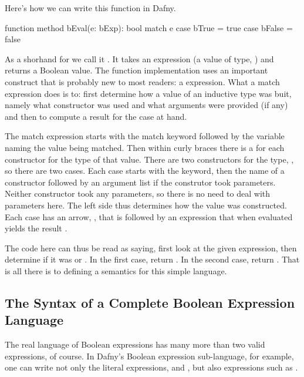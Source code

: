 \documentclass[letterpaper,10pt,english]{sphinxmanual}
\begin{document}
Here’s how we can write this function in Dafny.

\begin{sphinxVerbatim}[commandchars=\\\{\}]
function method bEval(e: bExp): bool
\PYGZob{}
  match e
  \PYGZob{}
      case bTrue =\PYGZgt{} true
      case bFalse =\PYGZgt{} false
  \PYGZcb{}
\PYGZcb{}
\end{sphinxVerbatim}

As a shorhand for  we call it . It
takes an expression (a value of type, ) and returns a Boolean
value.  The function implementation uses an important construct that
is probably new to most readers: a  expression. What a match
expression does is to: first determine how a value of an inductive
type was buit, namely what constructor was used and what arguments
were provided (if any) and then to compute a result for the case at
hand.

The match expression starts with the match keyword followed by the
variable naming the value being matched. Then within curly braces
there is a  for each constructor for the type of that value.
There are two constructors for the type, , so there are two
cases. Each case starts with the  keyword, then the name of a
constructor followed by an argument list if the construtor took
parameters. Neither constructor took any parameters, so there is no
need to deal with parameters here. The left side thus determines how
the value was constructed. Each case has an arrow, \sphinxstyleemphasis{=\textgreater{}}, that is
followed by an expression that when evaluated yields the result .

The code here can thus be read as saying, first look at the given
expression, then determine if it was  or . In the first
case, return . In the second case, return . That is all
there is to defining a semantics for this simple language.


\subsection{The Syntax of a Complete Boolean Expression Language}
\label{\detokenize{07-boolean-algebra:the-syntax-of-a-complete-boolean-expression-language}}
The real language of Boolean expressions has many more than two valid
expressions, of course. In Dafny’s Boolean expression sub-language,
for example, one can write not only the literal expressions, 
and , but also expressions such as .
\end{document}
